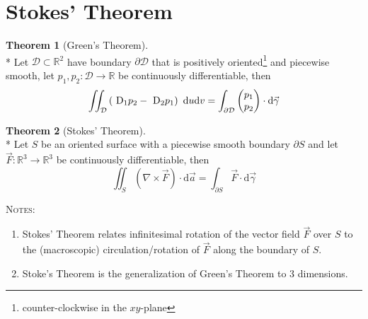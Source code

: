 \documentclass[10pt,a4paper]{report}
\theoremstyle{definition}
\newtheorem{theorem}{Theorem}[chapter]
\theoremstyle{plain}
\theoremstyle{definition}
\theoremstyle{plain}
\newcommand{\dd}{\mathop{}\,\mathrm{d}}
\newcommand{\DD}{\mathop{}\,\mathrm{D}}
\newcommand{\ddns}{\mathrm{d}}
\newenvironment{colvectorenvironment}{\left(\!\!\!\begin{array}{c}}{\end{array}\!\!\!\right)}
\newenvironment{notes}{\par\begin{tcolorbox}\textsc{Notes:}\begin{enumerate}[1)]}{\end{enumerate}\end{tcolorbox}}
\newcommand{\real}{\mathbb{R}}
\newcommand{\domain}{\mathcal{D}}
\newcommand{\curl}[1]{\nabla\!\times\!#1}
\begin{document}
\section{Stokes' Theorem}

\begin{theorem}[Green's Theorem]\label{thm:1-1}\ \\*
    Let $\domain \subset \real^2$ have boundary $\partial\domain$ that is positively oriented\footnote{counter-clockwise in the $xy$-plane}
    and piecewise smooth, let $p_1,p_2\colon\domain\to\real$ be continuously differentiable, then
    \[
        \iint_\domain \left( \DD_1p_2 - \DD_2p_1 \right) \dd u\ddns v
        = \int_{\partial\domain}\begin{colvectorenvironment}p_1\\p_2\end{colvectorenvironment} \cdot \ddns\vec{\gamma}
    \]
\end{theorem}

\begin{theorem}[Stokes' Theorem]\label{thm:1-2}\ \\*
    Let $S$ be an oriented surface with a piecewise smooth boundary $\partial S$ and let $\vec{F}\colon \real^3\to\real^3$ be continuously
    differentiable, then
    \[
        \iint_S \left( \curl{\vec{F}} \right) \cdot \ddns\vec{a} = \int_{\partial S}\vec{F}\cdot\ddns\vec{\gamma}
    \]

    \begin{notes}
        \item
            Stokes' Theorem relates infinitesimal rotation of the vector field $\vec{F}$ over $S$ to the (macroscopic) circulation/rotation
            of $\vec{F}$ along the boundary of $S$.
        \item
            Stoke's Theorem is the generalization of Green's Theorem to 3 dimensions.
    \end{notes}
\end{theorem}
\end{document}

